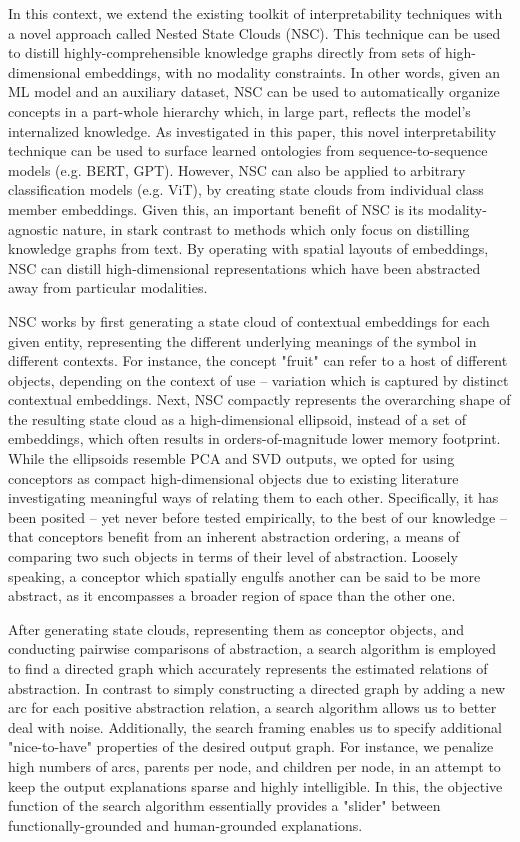 In this context, we extend the existing toolkit of interpretability techniques with a novel approach called Nested State Clouds (NSC). This technique can be used to distill highly-comprehensible knowledge graphs directly from sets of high-dimensional embeddings, with no modality constraints. In other words, given an ML model and an auxiliary dataset, NSC can be used to automatically organize concepts in a part-whole hierarchy which, in large part, reflects the model's internalized knowledge. As investigated in this paper, this novel interpretability technique can be used to surface learned ontologies from sequence-to-sequence models (e.g. BERT, GPT). However, NSC can also be applied to arbitrary classification models (e.g. ViT), by creating state clouds from individual class member embeddings. Given this, an important benefit of NSC is its modality-agnostic nature, in stark contrast to methods which only focus on distilling knowledge graphs from text. By operating with spatial layouts of embeddings, NSC can distill high-dimensional representations which have been abstracted away from particular modalities.

NSC works by first generating a state cloud of contextual embeddings for each given entity, representing the different underlying meanings of the symbol in different contexts. For instance, the concept "fruit" can refer to a host of different objects, depending on the context of use -- variation which is captured by distinct contextual embeddings. Next, NSC compactly represents the overarching shape of the resulting state cloud as a high-dimensional ellipsoid, instead of a set of embeddings, which often results in orders-of-magnitude lower memory footprint. While the ellipsoids resemble PCA and SVD outputs, we opted for using conceptors as compact high-dimensional objects due to existing literature investigating meaningful ways of relating them to each other. Specifically, it has been posited -- yet never before tested empirically, to the best of our knowledge -- that conceptors benefit from an inherent abstraction ordering, a means of comparing two such objects in terms of their level of abstraction. Loosely speaking, a conceptor which spatially engulfs another can be said to be more abstract, as it encompasses a broader region of space than the other one.

After generating state clouds, representing them as conceptor objects, and conducting pairwise comparisons of abstraction, a search algorithm is employed to find a directed graph which accurately represents the estimated relations of abstraction. In contrast to simply constructing a directed graph by adding a new arc for each positive abstraction relation, a search algorithm allows us to better deal with noise. Additionally, the search framing enables us to specify additional "nice-to-have" properties of the desired output graph. For instance, we penalize high numbers of arcs, parents per node, and children per node, in an attempt to keep the output explanations sparse and highly intelligible. In this, the objective function of the search algorithm essentially provides a "slider" between functionally-grounded and human-grounded explanations.

